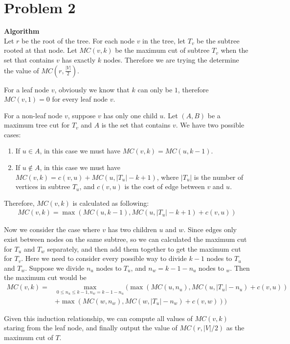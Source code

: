 \documentclass{article}
\newcommand{\Algorithm}{\textbf{Algorithm} \\}
\begin{document}
\section*{Problem 2}
\Algorithm
Let $r$ be the root of the tree. For each node $v$ in the tree, let $T_v$ be the subtree rooted at 
that node. Let $MC(v, k)$ be the maximum cut of subtree $T_v$ when the set that contains $v$ has
exactly $k$ nodes. Therefore we are trying the determine the value of $MC(r, \frac{|V|}{2})$.

For a leaf node $v$, obviously we know that $k$ can only be $1$, therefore $MC(v, 1) = 0$ for every
leaf node $v$.

For a non-leaf node $v$, suppose $v$ has only one child $u$. Let $(A, B)$ be a maximum tree cut for
$T_v$ and $A$ is the set that contains $v$. We have two possible cases:
\begin{enumerate}
  \item If $u \in A$, in this case we must have $MC(v, k) = MC(u, k-1)$.
  \item If $u \notin A$, in this case we must have $MC(v, k) = c(v, u) + MC(u, |T_u| - k + 1)$, where $|T_u|$
    is the number of vertices in subtree $T_u$, and $c(v, u)$ is the cost of edge between $v$ and
    $u$. 
\end{enumerate}
Therefore, $MC(v, k)$ is calculated as following:
\begin{align}
MC(v, k) = \max(MC(u, k-1), MC(u, |T_u| - k + 1) + c(v, u))
\end{align}

Now we consider the case where $v$ has two children $u$ and $w$. Since edges only exist between
nodes on the same subtree, so we can calculated the maximum cut for $T_u$ and $T_w$ separately, and
then add them together to get the maximum cut for $T_v$. Here
we need to consider every possible way to divide $k-1$ nodes to $T_u$ and $T_w$. Suppose we
divide $n_u$ nodes to $T_u$, and $n_w = k - 1 - n_u$ nodes to $_w$. Then the maximum cut would be
\begin{align}
  MC(v, k) = & \max_{0 \leq n_u \leq k-1, n_w = k-1 -n_u} \Big( \max(MC(u, n_u), MC(u, |T_u| - n_u 
  ) + c(v, u)) \\
  & + \max(MC(w, n_w), MC(w, |T_u| - n_w) + c(v, w))
  \Big)
\end{align}

Given this induction relationship, we can compute all values of $MC(v, k)$ staring from the leaf
node, and finally output the value of $MC(r, |V| / 2)$ as the maximum cut of $T$.
\end{document}
